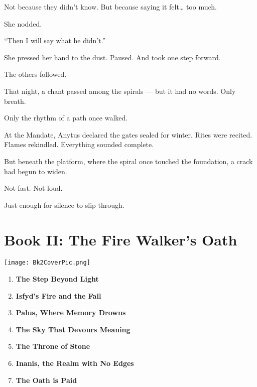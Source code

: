 \documentclass[12pt]{article}
\begin{document}
Not because they didn’t know.  
But because saying it felt… too much.

She nodded.

 “Then I will say what he didn’t.”

She pressed her hand to the dust.  
Paused.  
And took one step forward.

The others followed.

That night, a chant passed among the spirals —  
but it had no words.  
Only breath.

Only the rhythm of a path once walked.

At the Mandate, Anytus declared the gates sealed for winter.  
Rites were recited.  
Flames rekindled.  
Everything sounded complete.

But beneath the platform,  
where the spiral once touched the foundation,  
a crack had begun to widen.

Not fast.  
Not loud.

Just enough  
for silence to slip through.

\newpage

\section*{Book II: The Fire Walker's Oath}

\vspace{.5in}

\begin{center}
    \texttt{[image: Bk2CoverPic.png]}
\end{center}

\vspace{.5in}

\begin{enumerate}
    \item \textbf{The Step Beyond Light} 

    \vspace{1em}
    \item \textbf{Isfyd's Fire and the Fall} 

    \vspace{1em}
    \item \textbf{Palus, Where Memory Drowns} 

    \vspace{1em}
    \item \textbf{The Sky That Devours Meaning} 

    \vspace{1em}
    \item \textbf{The Throne of Stone} 

    \vspace{1em}
    \item \textbf{Inanis, the Realm with No Edges}

    \vspace{1em}
    \item \textbf{The Oath is Paid} 

\end{enumerate}
\end{document}
